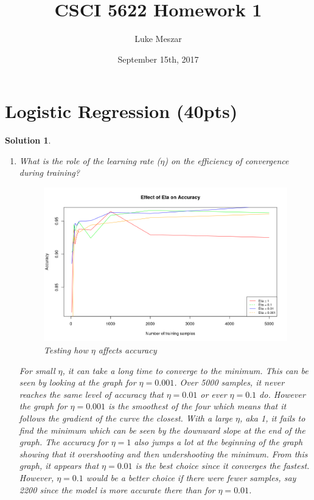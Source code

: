 \documentclass[12pt]{article}
\author{Luke Meszar}
\date{September 15th, 2017}
\title{CSCI 5622 Homework 1}
\newtheorem*{solution*}{Solution}
\theoremstyle{definition}
\begin{document}
	\thispagestyle{empty}
	
	\newlength{\boxlength}\setlength{\boxlength}{\textwidth}
	\addtolength{\boxlength}{-4mm}
	
	\begin{center}
	\end{center}
	\section{Logistic Regression (40pts)}																																									
	\begin{solution*}\leavevmode
		\begin{enumerate}[label=\arabic*.,font=\upshape]
			\item \textnormal{What is the role of the learning rate ($\eta$) on the efficiency of convergence during training?}
			\begin{figure}[H]
				\centering
				\includegraphics[scale=0.4]{EtaVsAccuracy}
				\caption{Testing how $\eta$ affects accuracy}
				\label{fig:etavsaccuracy}
			\end{figure}
			For small $\eta$, it can take a long time to converge to the minimum. This can be seen by looking at the graph for $\eta = 0.001$. Over 5000 samples, it never reaches the same level of accuracy that $\eta = 0.01$ or ever $\eta = 0.1$ do. However the graph for $\eta = 0.001$ is the smoothest of the four which means that it  follows the gradient of the curve the closest. With a large $\eta$, aka 1, it fails to find the minimum which can be seen by the downward slope at the end of the graph. The accuracy for $\eta = 1$ also jumps a lot at the beginning of the graph showing that it overshooting and then undershooting the minimum. From this graph, it appears that $\eta = 0.01$ is the best choice since it converges the fastest. However, $\eta = 0.1$ would be a better choice if there were fewer samples, say 2200 since the model is more accurate there than for $\eta = 0.01$. 

\end{enumerate}
\end{solution*}
\end{document}
